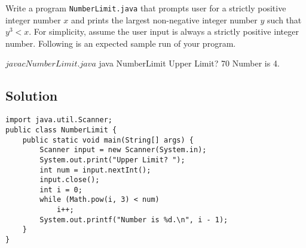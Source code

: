 \documentclass[12pt,letterpaper,twoside]{article}
\begin{document}
Write a program \texttt{NumberLimit.java} that prompts user for a strictly positive integer number $x$ and prints the largest non-negative integer number $y$ such that $y^3 < x$.
For simplicity, assume the user input is always a strictly positive integer number.
Following is an expected sample run of your program.

\begin{terminal}
$ javac NumberLimit.java
$ java NumberLimit
Upper Limit? 70
Number is 4.
\end{terminal}

\subsection*{Solution}

\lstset{language=Java,tabsize=4}
\begin{lstlisting}
import java.util.Scanner;
public class NumberLimit {
	public static void main(String[] args) {
		Scanner input = new Scanner(System.in);
		System.out.print("Upper Limit? ");
		int num = input.nextInt();
		input.close();
		int i = 0;
		while (Math.pow(i, 3) < num)
			i++;
		System.out.printf("Number is %d.\n", i - 1);
	}
}
\end{lstlisting}
\end{document}

